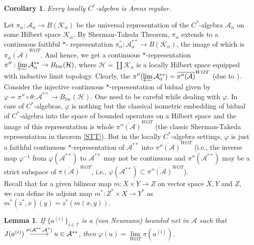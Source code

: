 \documentclass[10pt]{article}
\newtheorem{corollary}{Corollary}[theorem]
\newtheorem{lemma}[theorem]{Lemma}
\theoremstyle{definition}
\DeclareRobustCommand{\looongrightarrow}{%
	\DOTSB\relbar\joinrel\relbar\joinrel\relbar\joinrel\rightarrow}
\begin{document}
\begin{corollary}
	Every locally $C^*$-algebra is Arens regular.
\end{corollary}
Let $\pi_\alpha:\mathcal A_\alpha\to B(\mathcal K_\alpha)$ be the universal representation of the $C^*$-algebra $\mathcal A_\alpha$ on some Hilbert space $\mathcal K_\alpha$. By Sherman-Takeda Theorem, $\pi_\alpha$ extends to a continuous faithful $*$- representation $\pi_\alpha^{''}:\mathcal A_\alpha^{**}\to B(\mathcal K_\alpha)$, the image of which is $\overline{\pi_\alpha(\mathcal A)}^{WOT}$. And hence, we get a continuous $*$-representation $\pi'':\varprojlim\mathcal A^{**}_\alpha\to B_{loc}(\mathcal H)$, where $\mathcal H=\coprod\mathcal K_\alpha$ is a locally Hilbert space equipped with inductive limit topology. Clearly, the $\pi''(\varprojlim\mathcal A_\alpha^{**})=\overline{\pi''(\mathcal A )}^{WOT}$ (due to \cite[Th. 3.6, Prop. 3.15]{Joita}).\\

 Consider the injective continuous $*$-representation of bidual given by $\varphi=\pi''\circ \theta: \mathcal A^{**}\to B_{loc}(\mathcal H)$. One need to be careful while dealing with $\varphi$. In case of $C^*$-algebras, $\varphi$ is nothing but the classical isometric embedding of bidual of $C^*$-algebra into the space of bounded operators on a Hilbert space and the image of this representation is whole $\overline{\pi''(\mathcal A)}^{WOT}$ (the classic Sherman-Takeda representation in theorem \ref{STT}). But in the locally $C^*$-algebra settings, $\varphi$ is just a faithful continuous $*$-representation of $\mathcal A^{**}$ into $\overline{\pi''(\mathcal A)}^{WOT}$ (i.e., the inverse map $\varphi^{-1}$ from $\varphi(\mathcal A^{**})$ to $\mathcal A^{**}$ may not be continuous and $\pi''(\mathcal A^{**})$ may be a strict subspace of $\overline{\pi(\mathcal A)}^{WOT}$, i.e., $\varphi(\mathcal A^{**})\subset \overline{\pi''(\mathcal A)}^{WOT}$). \\

Recall that for a given bilinear map $m:X\times Y\to Z$ on vector space $X,Y$ and $Z$, we can define its adjoint map $m^*:Z^*\times X\to Y^*$ as $m^*(z^*,x)(y)=z^*(m(x,y))$.
\begin{lemma}\label{weak-wot}
If $\{a^{(i)}\}_{i\in\mathcal I}$ is a (von Neumann) bounded net in $\mathcal A$ such that $J({a^{(i)}})\overset{\sigma(\mathcal A^{**},\mathcal A^*)}{\looongrightarrow}u\in \mathcal A^{**}$, then $\varphi(u)=\underset{WOT}{\lim} \pi(a^{(i)})$.
\end{lemma}
\end{document}
